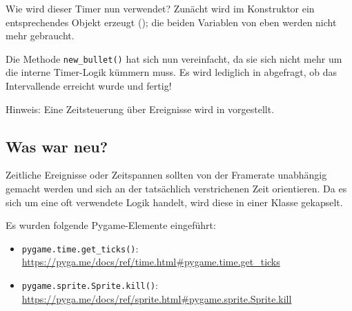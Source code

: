 Wie wird dieser Timer nun verwendet? Zunächt wird im Konstruktor ein entsprechendes Objekt erzeugt (); die beiden Variablen von eben werden nicht mehr gebraucht.


Die Methode \texttt{new\_bullet()} hat sich nun vereinfacht, da sie sich nicht mehr um die interne Timer-Logik kümmern muss. Es wird lediglich in  abgefragt, ob das Intervallende erreicht wurde und fertig!


Hinweis: Eine Zeitsteuerung über Ereignisse wird in  vorgestellt.

\subsection*{Was war neu?}
Zeitliche Ereignisse oder Zeitspannen sollten von der Framerate unabhängig gemacht werden und sich an der tatsächlich verstrichenen Zeit orientieren. Da es sich um eine oft verwendete Logik handelt, wird diese in einer Klasse gekapselt.

Es wurden folgende Pygame-Elemente eingeführt:
\begin{itemize}
	\item \texttt{pygame.time.get\_ticks()}:
	\\ 
    \url{https://pyga.me/docs/ref/time.html#pygame.time.get_ticks}
	
	\item \texttt{pygame.sprite.Sprite.kill()}:
	\\ 
	\url{https://pyga.me/docs/ref/sprite.html#pygame.sprite.Sprite.kill}

\end{itemize}